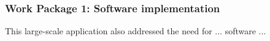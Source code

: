 %
%
%
%
%

\subsubsection{Work Package 1: Software implementation} %


This large-scale application also addressed the need for ... software ...

